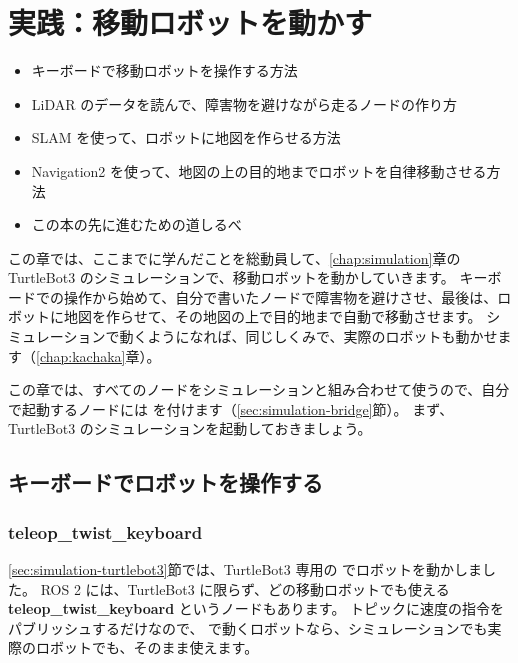 \chapter{実践：移動ロボットを動かす}
\label{chap:practice}

\begin{goalbox}
  \begin{itemize}
    \item キーボードで移動ロボットを操作する方法
    \item LiDAR のデータを読んで、障害物を避けながら走るノードの作り方
    \item SLAM を使って、ロボットに地図を作らせる方法
    \item Navigation2 を使って、地図の上の目的地までロボットを自律移動させる方法
    \item この本の先に進むための道しるべ
  \end{itemize}
\end{goalbox}

この章では、ここまでに学んだことを総動員して、\ref{chap:simulation}章の TurtleBot3 のシミュレーションで、移動ロボットを動かしていきます。
キーボードでの操作から始めて、自分で書いたノードで障害物を避けさせ、最後は、ロボットに地図を作らせて、その地図の上で目的地まで自動で移動させます。
シミュレーションで動くようになれば、同じしくみで、実際のロボットも動かせます（\ref{chap:kachaka}章）。

この章では、すべてのノードをシミュレーションと組み合わせて使うので、自分で起動するノードには  を付けます（\ref{sec:simulation-bridge}節）。
まず、TurtleBot3 のシミュレーションを起動しておきましょう。


\section{キーボードでロボットを操作する}
\label{sec:practice-teleop}

\subsection{teleop\_twist\_keyboard}

\ref{sec:simulation-turtlebot3}節では、TurtleBot3 専用の  でロボットを動かしました。
ROS 2 には、TurtleBot3 に限らず、どの移動ロボットでも使える \textbf{teleop\_twist\_keyboard} というノードもあります。
 トピックに速度の指令をパブリッシュするだけなので、 で動くロボットなら、シミュレーションでも実際のロボットでも、そのまま使えます。

